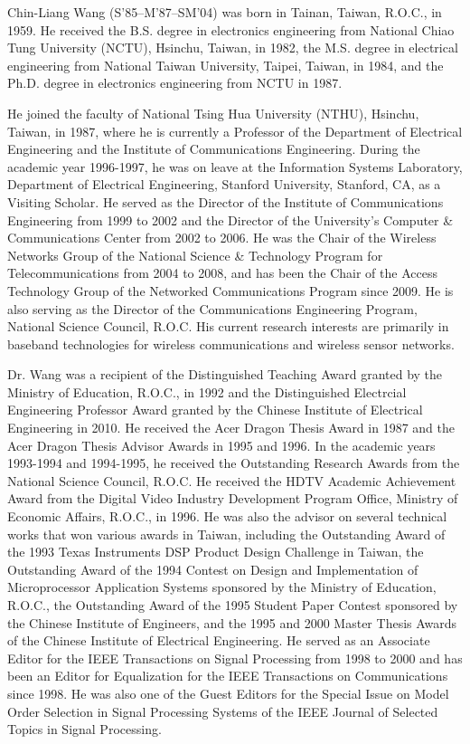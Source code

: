 \documentclass[journal,twoside,final]{IEEEtran}
\begin{document}
\begin{IEEEbiography}{Chin-Liang Wang}
(S\mbox{'}85--M\mbox{'}87--SM\mbox{'}04) was born in Tainan, Taiwan, R.O.C., in 1959. He received the B.S. degree in electronics engineering from National Chiao Tung University (NCTU), Hsinchu, Taiwan, in 1982, the M.S. degree in electrical engineering from National Taiwan University, Taipei, Taiwan, in 1984, and the Ph.D. degree in electronics engineering from NCTU in 1987.

He joined the faculty of National Tsing Hua University (NTHU), Hsinchu, Taiwan, in 1987, where he is currently a Professor of the Department of Electrical Engineering and the Institute of Communications Engineering. During the academic year 1996-1997, he was on leave at the Information Systems Laboratory, Department of Electrical Engineering, Stanford University, Stanford, CA, as a Visiting Scholar. He served as the Director of the Institute of Communications Engineering from 1999 to 2002 and the Director of the University’s Computer \& Communications Center from 2002 to 2006. He was the Chair of the Wireless Networks Group of the National Science \& Technology Program for Telecommunications from 2004 to 2008, and has been the Chair of the Access Technology Group of the Networked Communications Program since 2009. He is also serving as the Director of the Communications Engineering Program, National Science Council, R.O.C. His current research interests are primarily in baseband technologies for wireless communications and wireless sensor networks.

Dr. Wang was a recipient of the Distinguished Teaching Award granted by the Ministry of Education, R.O.C., in 1992 and the Distinguished Electrcial Engineering Professor Award granted by the Chinese Institute of Electrical Engineering in 2010. He received the Acer Dragon Thesis Award in 1987 and the Acer Dragon Thesis Advisor Awards in 1995 and 1996. In the academic years 1993-1994 and 1994-1995, he received the Outstanding Research Awards from the National Science Council, R.O.C. He received the HDTV Academic Achievement Award from the Digital Video Industry Development Program Office, Ministry of Economic Affairs, R.O.C., in 1996. He was also the advisor on several technical works that won various awards in Taiwan, including the Outstanding Award of the 1993 Texas Instruments DSP Product Design Challenge in Taiwan, the Outstanding Award of the 1994 Contest on Design and Implementation of Microprocessor Application Systems sponsored by the Ministry of Education, R.O.C., the Outstanding Award of the 1995 Student Paper Contest sponsored by the Chinese Institute of Engineers, and the 1995 and 2000 Master Thesis Awards of the Chinese Institute of Electrical Engineering. He served as an Associate Editor for the IEEE Transactions on Signal Processing from 1998 to 2000 and has been an Editor for Equalization for the IEEE Transactions on Communications since 1998. He was also one of the Guest Editors for the Special Issue on Model Order Selection in Signal Processing Systems of the IEEE Journal of Selected Topics in Signal Processing.
\end{IEEEbiography}
\vfill
\end{document}
